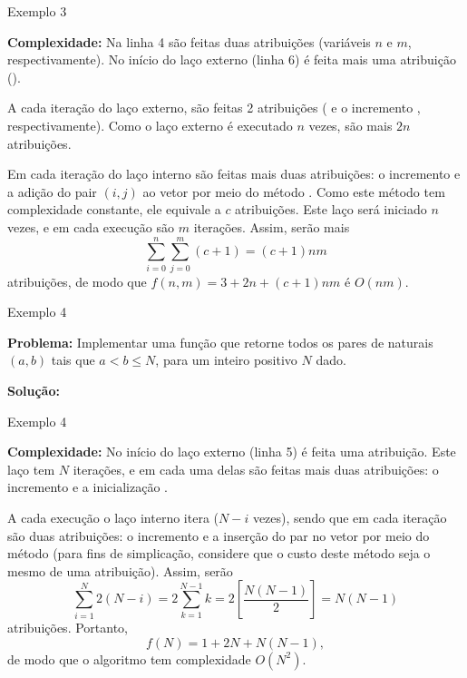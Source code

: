 \begin{frame}[fragile]{Exemplo 3}

    {\bf Complexidade: } Na linha 4 são feitas duas atribuições (variáveis $n$ e $m$, 
        respectivamente). No início do laço externo (linha 6) é feita mais uma atribuição
        ().

        A cada iteração do laço externo, são feitas 2 atribuições ( e o 
        incremento , respectivamente). Como o laço externo é executado $n$ vezes, 
        são mais $2n$ atribuições.

        Em cada iteração do laço interno são feitas mais duas atribuições: o incremento 
         e a adição do pair $(i, j)$ ao vetor  por meio do método
        . Como este método tem complexidade constante, ele equivale a 
        $c$ atribuições. Este laço será iniciado $n$ vezes, e em cada execução são $m$ iterações.
        Assim, serão mais
        \[
            \sum_{i = 0}^n\sum_{j = 0}^m (c + 1) = (c + 1)nm
        \]
        atribuições, de modo que $f(n, m) = 3 + 2n + (c + 1)nm$ é $O(nm)$.
\end{frame}

\begin{frame}[fragile]{Exemplo 4}

    {\bf Problema:} Implementar uma função que retorne todos os pares de naturais $(a, b)$ tais
        que $a < b \leq N$, para um inteiro positivo $N$ dado.
	\vspace{0.1in}

    {\bf Solução:} 
    \vspace{0.2in}

\end{frame}

\begin{frame}[fragile]{Exemplo 4}
    
    \textbf{Complexidade:} No início do laço externo (linha 5) é feita uma atribuição. Este
    laço tem $N$ iterações, e em cada uma delas são feitas mais duas atribuições: o incremento
     e a inicialização .

    A cada execução o laço interno itera ($N - i$ vezes), sendo que em cada iteração são duas
    atribuições: o incremento  e a inserção do par no vetor por meio do
    método  (para fins de simplicação, considere que o custo deste método
    seja o mesmo de uma atribuição). Assim, serão
    \[
        \sum_{i = 1}^N 2(N - i) = 2\sum_{k = 1}^{N - 1} k = 2\left[\frac{N(N - 1)}{2}\right] 
            = N(N - 1)
    \]
    atribuições.  Portanto,
    \[
        f(N) = 1 + 2N + N(N - 1),
    \]
    de modo que o algoritmo tem complexidade $O(N^2)$.
    
\end{frame}

